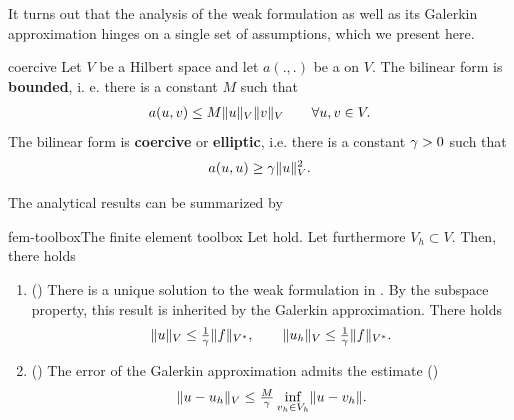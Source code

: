 It turns out that the analysis of the weak formulation as well as its
Galerkin approximation hinges on a single set of assumptions, which we
present here.

\begin{Assumption}{coercive}
  Let $V$ be a Hilbert space and let $a(.,.)$ be a  on $V$.  The bilinear form is
  \textbf{bounded}, i. e. there is a
  constant $M$ such that
  \begin{gather}
    a(u,v) \le M \lVert u\rVert_V \lVert v\rVert_V \qquad \forall u,v\in V.
  \end{gather}
  The bilinear form is \textbf{coercive}
  or \textbf{elliptic}, i.e. there is a
  constant $\gamma > 0$ such that
  \begin{gather}
    \label{eq:infsup:elliptic}
    a(u,u) \ge \gamma \lVert u\rVert_V^2.
  \end{gather}
\end{Assumption}

The analytical results can be summarized by

\begin{Theorem*}{fem-toolbox}{The finite element toolbox}
  Let  hold. Let furthermore
  $V_h\subset V$. Then, there holds
  \begin{enumerate}
  \item () There is a unique solution to
    the weak formulation in
    . By the subspace
    property, this result is inherited by the Galerkin
    approximation. There holds
    \begin{gather}
      \lVert u\rVert_V \le \tfrac1{\gamma} \lVert f\rVert_{V^*},
      \qquad
      \lVert u_h\rVert_V \le \tfrac1{\gamma} \lVert f\rVert_{V^*}.
    \end{gather}
  \item () The error of the Galerkin
    approximation admits the estimate ()
    \begin{gather}
      \lVert u-u_h\rVert_V \le \tfrac{M}{\gamma}\inf_{v_h\in V_h}\lVert u-v_h\rVert.
    \end{gather}
  \end{enumerate}
\end{Theorem*}

